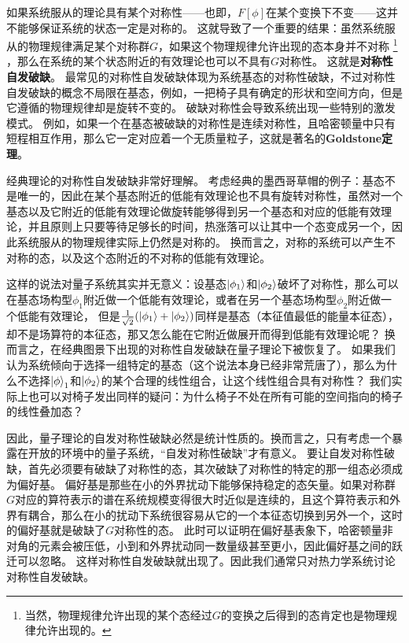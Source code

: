 \documentclass[hyperref, UTF8, a4paper]{ctexart}
\begin{document}
如果系统服从的理论具有某个对称性——也即，$F[\phi]$在某个变换下不变——这并不能够保证系统的状态一定是对称的。
这就导致了一个重要的结果：虽然系统服从的物理规律满足某个对称群$G$，如果这个物理规律允许出现的态本身并不对称%
\footnote{当然，物理规律允许出现的某个态经过$G$的变换之后得到的态肯定也是物理规律允许出现的。}%
，那么在系统的某个状态附近的有效理论也可以不具有$G$对称性。
这就是\textbf{对称性自发破缺}。
最常见的对称性自发破缺体现为系统基态的对称性破缺，不过对称性自发破缺的概念不局限在基态，例如，一把椅子具有确定的形状和空间方向，但是它遵循的物理规律却是旋转不变的。
破缺对称性会导致系统出现一些特别的激发模式。
例如，如果一个在基态被破缺的对称性是连续对称性，且哈密顿量中只有短程相互作用，那么它一定对应着一个无质量粒子，这就是著名的\textbf{Goldstone定理}。

经典理论的对称性自发破缺非常好理解。
考虑经典的墨西哥草帽的例子：基态不是唯一的，因此在某个基态附近的低能有效理论也不具有旋转对称性，虽然对一个基态以及它附近的低能有效理论做旋转能够得到另一个基态和对应的低能有效理论，并且原则上只要等待足够长的时间，热涨落可以让其中一个态变成另一个，因此系统服从的物理规律实际上仍然是对称的。
换而言之，对称的系统可以产生不对称的态，以及这个态附近的不对称的低能有效理论。

这样的说法对量子系统其实并无意义：设基态$\ket{\phi_1}$和$\ket{\phi_2}$破坏了对称性，那么可以在基态场构型$\phi_1$附近做一个低能有效理论，或者在另一个基态场构型$\phi_2$附近做一个低能有效理论，
但是$\frac{1}{\sqrt{2}} (\ket{\phi_1} + \ket{\phi_2})$同样是基态（本征值最低的能量本征态），却不是场算符的本征态，那又怎么能在它附近做展开而得到低能有效理论呢？
换而言之，在经典图景下出现的对称性自发破缺在量子理论下被恢复了。
如果我们认为系统倾向于选择一组特定的基态（这个说法本身已经非常荒唐了），那么为什么不选择$\ket{\phi}_1$和$\ket{\phi_2}$的某个合理的线性组合，让这个线性组合具有对称性？
我们实际上也可以对椅子发出同样的疑问：为什么椅子不处在所有可能的空间指向的椅子的线性叠加态？

因此，量子理论的自发对称性破缺必然是统计性质的。换而言之，只有考虑一个暴露在开放的环境中的量子系统，“自发对称性破缺”才有意义。
要让自发对称性破缺，首先必须要有破缺了对称性的态，其次破缺了对称性的特定的那一组态必须成为偏好基。
偏好基是那些在小的外界扰动下能够保持稳定的态矢量。如果对称群$G$对应的算符表示的谱在系统规模变得很大时近似是连续的，且这个算符表示和外界有耦合，那么在小的扰动下系统很容易从它的一个本征态切换到另外一个，这时的偏好基就是破缺了$G$对称性的态。
此时可以证明在偏好基表象下，哈密顿量非对角的元素会被压低，小到和外界扰动同一数量级甚至更小，因此偏好基之间的跃迁可以忽略。
这样对称性自发破缺就出现了。因此我们通常只对热力学系统讨论对称性自发破缺。
\end{document}
